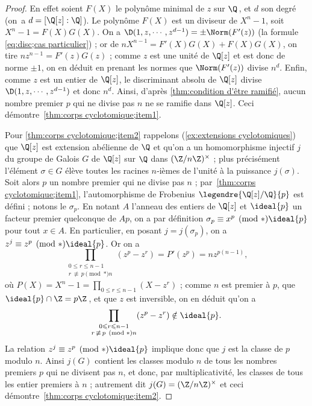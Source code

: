 \documentclass[11pt, %
  title in boldface,
  theorem in new line,
  theorem numbering = section,
  number theorems separately,
  simple name,
]{beaulivre}
\begin{document}
    \begin{proof}
        En effet soient \( F(X) \) le polynôme minimal de \( z \) sur \( \Q \)\,, et \( d \) son degré (on~a \( d = [\Q[z]:\Q] \)). Le polynôme \( F(X) \) est un diviseur de \( X^n-1 \), soit \( X^n-1 = F(X)G(X) \). On a \( \D(1, z, \cdots, z^{d-1}) = \pm \Norm(F'(z)) \) (la formule \eqref{eq:disc;cas particulier}) ; or de \( n X^{n-1} = F'(X)G(X) + F(X)G(X) \), on tire \( n z^{n-1} = F'(z)G(z) \) ; comme \( z \) est une unité de \( \Q[z] \) et est donc de norme \( \pm 1 \), on en déduit en prenant les normes que \( \Norm(F'(z)) \) divise \( n^d \). Enfin, comme \( z \) est un entier de \( \Q[z] \), le discriminant absolu de \( \Q[z] \) divise \( \D(1, z, \cdots, z^{d-1}) \) et donc \( n^d \). Ainsi, d'après \cref{thm:condition d'être ramifié}, aucun nombre premier \( p \) qui ne divise pas \( n \) ne se ramifie dans \( \Q[z] \). Ceci démontre~\ref{thm:corps cyclotomique;item1}.

        Pour \ref{thm:corps cyclotomique;item2} rappelons (\cref{ex:extensions cyclotomiques}) que \( \Q[z] \) est extension abélienne de \( \Q \) et qu'on a un homomorphisme injectif \( j \) du groupe de Galois \( G \) de \( \Q[z] \) sur \( \Q \) dans \( (\Z/n\Z)^\times \) ; plus précisément l'élément \( \sigma \in G \) élève toutes les racines \( n \)‑ièmes de l'unité à la puissance \( j(\sigma) \). Soit alors \( p \) un nombre premier qui ne divise pas \( n \) ; par~\ref{thm:corps cyclotomique;item1}, l'automorphisme de Frobenius \( \legendre{\Q[z]/\Q}{p} \) est défini ; notons le \( \sigma_p \). En notant \( A \) l'anneau des entiers de \( \Q[z] \) et \( \ideal{p} \) un facteur premier quelconque de \( Ap \), on a par définition \( \sigma_p \equiv x^p \pmod*{\ideal{p}} \) pour tout \( x \in A \). En particulier, en posant \( j = j(\sigma_p) \), on a \( z^j \equiv z^p \pmod*{\ideal{p}} \). Or on a
        \[
            \prod_{\substack{0 \leqslant r \leqslant n-1 \\ r \,\not\equiv\, p \pmod*{n}}} (z^p-z^r) = P'(z^p) = n z^{p(n-1)},
        \]
        où \( P(X) = X^n-1 = \prod_{0 \leqslant r \leqslant n-1} (X-z^r) \) ; comme \( n \) est premier à \( p \), que \( \ideal{p} \cap \Z = p\Z \)\,, et que \( z \) est inversible, on en déduit qu'on a
        \[
            \prod_{\substack{0 \leqslant r \leqslant n-1 \\ r \,\not\equiv\, p \pmod*{n}}} (z^p-z^r) \notin \ideal{p}.
        \]
        La relation \( z^j \equiv z^p \pmod*{\ideal{p}} \) implique donc que \( j \) est la classe de \( p \) modulo \( n \). Ainsi \( j(G) \) contient les classes modulo \( n \) de tous les nombres premiers \( p \) qui ne divisent pas \( n \), et donc, par multiplicativité, les classes de tous les entier premiers à \( n \) ; autrement dit \( j(G) = (\Z/n\Z)^\times \) et ceci démontre~\ref{thm:corps cyclotomique;item2}.
    \end{proof}
\end{document}
